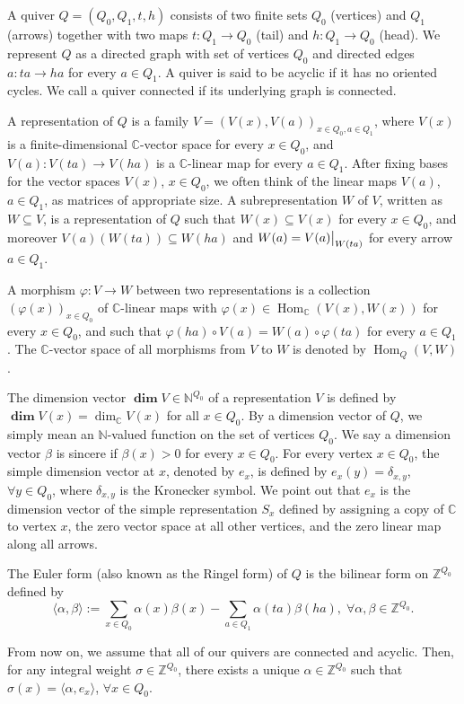 \documentclass[11pt]{article}
\theoremstyle{definition}
\numberwithin{equation}{section}
\newcommand{\Hom}{\operatorname{Hom}}
\newcommand{\ZZ}{\mathbb Z}
\newcommand{\CC}{\mathbb C}
\newcommand{\NN}{\mathbb N}
\newcommand{\V}{V}
\newcommand{\ddim}{\operatorname{\mathbf{dim}}}
\newcommand\restr[2]{{
  \left.\kern-\nulldelimiterspace 
  #1 
  \vphantom{\big|} 
  \right|_{#2} 
  }}
\begin{document}
A quiver $Q=(Q_0,Q_1,t,h)$ consists of two finite sets $Q_0$ (vertices) and $Q_1$ (arrows) together with two maps $t:Q_1 \to Q_0$ (tail) and $h:Q_1 \to Q_0$ (head). We represent $Q$ as a directed graph with set of vertices $Q_0$ and directed edges $a:ta \to ha$ for every $a \in Q_1$.  A quiver is said to be acyclic if it has no oriented cycles. We call a quiver connected if its underlying graph is connected.

A representation of $Q$ is a family $V=(V(x), V(a))_{x \in Q_0, a\in Q_1}$, where $V(x)$ is a finite-dimensional $\CC$-vector space for every $x \in Q_0$, and $V(a): V(ta) \to V(ha)$ is a $\CC$-linear map for every $a \in Q_1$. After fixing bases for the vector spaces $\V(x)$, $x \in Q_0$, we often think of the linear maps $\V(a)$, $a \in Q_1$, as matrices of appropriate size. A subrepresentation $W$ of $V$, written as $W \subseteq V$, is a representation of $Q$ such that $W(x) \subseteq V(x)$  for every $x \in Q_0$, and moreover $V(a)(W(ta)) \subseteq W(ha)$ and $W(a)=\restr{V(a)}{W(ta)}$ for every arrow $a \in Q_1$. 

A morphism $\varphi:V \rightarrow W$ between two representations is a collection $(\varphi(x))_{x \in Q_0}$ of $\CC$-linear maps with $\varphi(x) \in \Hom_{\CC}(V(x), W(x))$ for every $x \in Q_0$, and such that $\varphi(ha) \circ V(a)=W(a) \circ \varphi(ta)$ for every $a \in Q_1$. The $\CC$-vector space of all morphisms from $V$ to $W$ is denoted by $\Hom_Q(V, W)$.

The dimension vector $\ddim V \in \NN^{Q_0}$ of a representation $V$  is defined by $\ddim V(x)=\dim_\CC V(x)$ for all $x \in Q_0$. By a dimension vector of $Q$, we simply mean an $\NN$-valued function on the set of vertices $Q_0$. We say a dimension vector $\beta$ is sincere if $\beta(x)>0$ for every $x \in Q_0$. For every vertex $x \in Q_0$, the simple dimension vector at $x$, denoted by $e_x$, is defined by $e_x(y)=\delta_{x,y}$, $\forall y \in Q_0$, where $\delta_{x,y}$ is the Kronecker symbol. We point out that $e_x$ is the dimension vector of the simple representation $S_x$ defined by assigning a copy of $\CC$ to vertex $x$, the zero vector space at all other vertices, and the zero linear map along all arrows. 

The Euler form (also known as the Ringel form) of $Q$ is the bilinear form on $\ZZ^{Q_0}$ defined by
$$
\langle \alpha, \beta \rangle:=\sum_{x \in Q_0}\alpha(x)\beta(x)-\sum_{a \in Q_1} \alpha(ta)\beta(ha), \; \forall \alpha, \beta \in \ZZ^{Q_0}.
$$

From now on, we assume that all of our quivers are connected and acyclic. Then, for any integral weight $\sigma \in \ZZ^{Q_0}$, there exists a unique $\alpha \in \ZZ^{Q_0}$ such that $\sigma(x)=\langle \alpha, e_x \rangle$, $\forall x \in Q_0$. 
\end{document}
